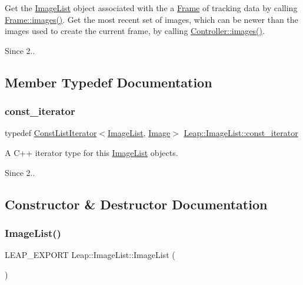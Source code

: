 Get the \hyperlink{class_leap_1_1_image_list}{Image\+List} object associated with the a \hyperlink{class_leap_1_1_frame}{Frame} of tracking data by calling \hyperlink{class_leap_1_1_frame_a64839985307492bf124b72ea13b1f2cf}{Frame\+::images()}. Get the most recent set of images, which can be newer than the images used to create the current frame, by calling \hyperlink{class_leap_1_1_controller_ac6fe10acc42b6c830e26fb8fbb88b895}{Controller\+::images()}.

\begin{DoxySince}{Since}
2.. 
\end{DoxySince}


\subsection{Member Typedef Documentation}
\mbox{\label{class_leap_1_1_image_list_ae3c17a6b8ac23853649ba93abd5a1dbe}} 
\subsubsection{\texorpdfstring{const\+\_\+iterator}{const\_iterator}}
{\footnotesize\ttfamily typedef \hyperlink{class_leap_1_1_const_list_iterator}{Const\+List\+Iterator}$<$\hyperlink{class_leap_1_1_image_list}{Image\+List}, \hyperlink{class_leap_1_1_image}{Image}$>$ \hyperlink{class_leap_1_1_image_list_ae3c17a6b8ac23853649ba93abd5a1dbe}{Leap\+::\+Image\+List\+::const\+\_\+iterator}}

A C++ iterator type for this \hyperlink{class_leap_1_1_image_list}{Image\+List} objects. \begin{DoxySince}{Since}
2.. 
\end{DoxySince}


\subsection{Constructor \& Destructor Documentation}
\mbox{\label{class_leap_1_1_image_list_a16614e13ece92455a024fd2409462753}} 
\subsubsection{\texorpdfstring{Image\+List()}{ImageList()}}
{\footnotesize\ttfamily L\+E\+A\+P\+\_\+\+E\+X\+P\+O\+RT Leap\+::\+Image\+List\+::\+Image\+List (\begin{DoxyParamCaption}{ }\end{DoxyParamCaption})}

